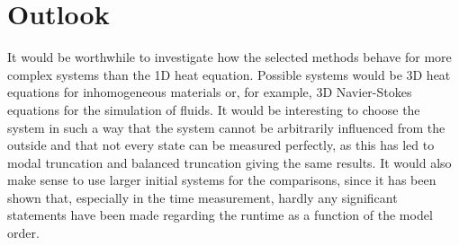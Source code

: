 \section{Outlook}
It would be worthwhile to investigate how the selected methods behave for more complex systems than the 1D heat equation.
Possible systems would be 3D heat equations for inhomogeneous materials or, for example, 3D Navier-Stokes equations for the simulation of fluids.
It would be interesting to choose the system in such a way that the system cannot be arbitrarily influenced from the outside and that not every state can be measured perfectly, as this has led to modal truncation and balanced truncation giving the same results.
It would also make sense to use larger initial systems for the comparisons, since it has been shown that, especially in the time measurement, hardly any significant statements have been made regarding the runtime as a function of the model order.